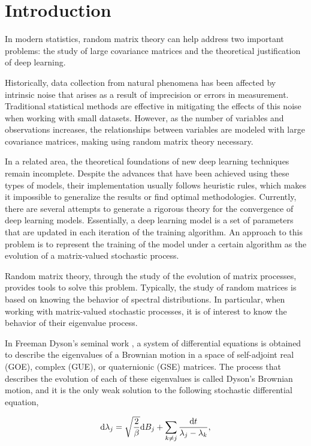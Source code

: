 \chapter*{Introduction}

In modern statistics, random matrix theory can help address two important problems: the study of large covariance matrices and the theoretical justification of deep learning.

Historically, data collection from natural phenomena has been affected by intrinsic noise that arises as a result of imprecision or errors in measurement. Traditional statistical methods are effective in mitigating the effects of this noise when working with small datasets. However, as the number of variables and observations increases, the relationships between variables are modeled with large covariance matrices, making using random matrix theory necessary.

In a related area, the theoretical foundations of new deep learning techniques remain incomplete. Despite the advances that have been achieved using these types of models, their implementation usually follows heuristic rules, which makes it impossible to generalize the results or find optimal methodologies. Currently, there are several attempts to generate a rigorous theory for the convergence of deep learning models. Essentially, a deep learning model is a set of parameters that are updated in each iteration of the training algorithm. An approach to this problem is to represent the training of the model under a certain algorithm as the evolution of a matrix-valued stochastic process.

Random matrix theory, through the study of the evolution of matrix processes, provides tools to solve this problem. Typically, the study of random matrices is based on knowing the behavior of spectral distributions. In particular, when working with matrix-valued stochastic processes, it is of interest to know the behavior of their eigenvalue process.

In Freeman Dyson's seminal work \cite{article:dyson}, a system of differential equations is obtained to describe the eigenvalues of a Brownian motion in a space of self-adjoint real (GOE), complex (GUE), or quaternionic (GSE) matrices. The process that describes the evolution of each of these eigenvalues is called Dyson's Brownian motion, and it is the only weak solution to the following stochastic differential equation,

\begin{equation}
\mathrm d\lambda_j = \sqrt{\frac2\beta} \mathrm d B_j + \sum_{k\neq j} \frac{\mathrm d t}{\lambda_j-\lambda_k}, \label{eq:dys}
\end{equation}


